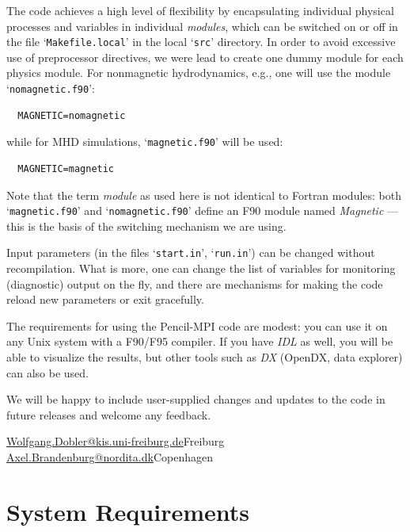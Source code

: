 \documentclass[12pt,twoside,notitlepage,a4paper]{article}
\newcommand{\file}[1]{`\texttt{#1}'}
\newcommand{\name}[1]{\textsl{#1}\index{#1}\/}
\begin{document}
The code achieves a high level of flexibility by encapsulating individual
physical processes and variables in individual \name{modules}, which can
be switched on or off in the file \file{Makefile.local} in the local
\file{src} directory.
In order to avoid excessive use of preprocessor directives, we were lead
to create one dummy module for each physics module.
For nonmagnetic hydrodynamics, e.g., one will use the module
\file{nomagnetic.f90}:
\begin{Verbatim}
  MAGNETIC=nomagnetic
\end{Verbatim}
while for MHD simulations, \file{magnetic.f90} will be used:
\begin{Verbatim}
  MAGNETIC=magnetic
\end{Verbatim}
Note that the term \name{module} as used here is not identical to Fortran
modules: both \file{magnetic.f90} and \file{nomagnetic.f90} define an F90
module named \emph{Magnetic} --- this is the basis of the switching
mechanism we are using.

Input parameters (in the files \file{start.in}, \file{run.in}) can be
changed without recompilation.
What is more, one can change the list of variables for monitoring
(diagnostic) output on the fly, and there are mechanisms for making the
code reload new parameters or exit gracefully.

The requirements for using the Pencil-MPI code are modest: you can use it
on any Unix system with a F90/F95 compiler. If you have \name{IDL} as
well, you will be able to visualize the results, but other tools such as
\name{DX} (OpenDX, data explorer) can also be used.

\bigskip

We will be happy to include user-supplied changes and updates to the code
in future releases and welcome any feedback.

\vspace{5mm}
\url{Wolfgang.Dobler@kis.uni-freiburg.de}\hfill Freiburg\\
\url{Axel.Brandenburg@nordita.dk}\hfill Copenhagen

\tableofcontents
\clearpage
\pagestyle{fancy}



\section{System Requirements}
\end{document}
